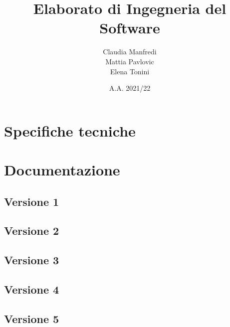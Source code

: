 \documentclass{report}
\title{Elaborato di Ingegneria del Software}
\author{Claudia Manfredi\\Mattia Pavlovic\\Elena Tonini}
\date{A.A. 2021/22}
\begin{document}
\maketitle
\tableofcontents

\chapter{Specifiche tecniche}


\chapter{Documentazione}

\section{Versione 1}





\cleardoublepage
\section{Versione 2}





\cleardoublepage
\section{Versione 3}





\cleardoublepage
\section{Versione 4}





\cleardoublepage
\section{Versione 5}




\end{document}

